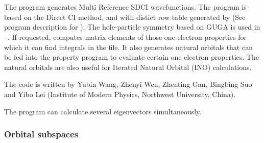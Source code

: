 \section{}
\label{UG:sec:GUGACI}

The
program generates Multi Reference SDCI
wavefunctions. The program is
based on the Direct CI method\cite{Roos:72},
and with distict row table generated by 
(See program description for
). The hole-particle symmetry based on GUGA is used
in \cite{YBWang:1}--\cite{BSuo:1}.
If requested,  computes matrix elements of those
one-electron properties for which it can find integrals in the
 file. It also
generates natural orbitals that can be fed into
the property program to evaluate certain one electron properties.
The natural orbitals are also useful for Iterated Natural Orbital
(INO)  calculations.

The  code is written by Yubin Wang,
Zhenyi Wen, Zhenting Gan, Bingbing Suo and Yibo Lei
(Institute of Modern Physics, Northwest University, China).

The program can calculate several eigenvectors simultaneously.

\subsubsection{Orbital subspaces}

